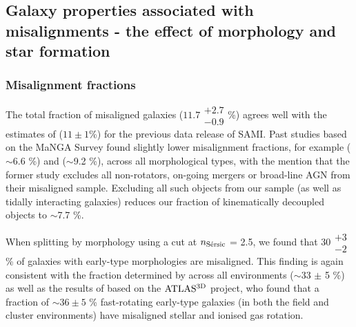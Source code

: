 \documentclass[fleqn,usenatbib]{mnras}
\begin{document}
\subsection{Galaxy properties associated with misalignments - the effect of morphology and star formation}
\label{sec:dpa_distr_discuss}

\subsubsection{Misalignment fractions}
The total fraction of misaligned galaxies ($11.7\substack{+2.7 \\ -0.9}$\%) agrees well with the estimates of \cite{Bryant2019} ($11\pm 1$\%) for the previous data release of SAMI. Past studies based on the MaNGA Survey found slightly lower misalignment fractions, for example \cite{Xu} ($\sim$6.6 \%) and \cite{Duckworth} ($\sim$9.2 \%), across all morphological types, with the mention that the former study excludes all non-rotators, on-going mergers or broad-line AGN from their misaligned sample. Excluding all such objects from our sample (as well as tidally interacting galaxies) reduces our fraction of kinematically decoupled objects to $\sim$7.7 \%.

When splitting by morphology using a cut at $n_{\rm{S\Acute{e}rsic}}$ = 2.5, we found that $30 \substack{+3 \\ -2}\ $\% of galaxies with early-type morphologies are misaligned. This finding is again consistent with the fraction determined by \cite{Bryant2019} across all environments ($\sim$33 $\pm$ 5 \%) as well as the results of \cite{Davis2011} based on the $\rm{ATLAS^{3D}}$ project, who found that a fraction of $\sim 36\pm 5$ \% fast-rotating early-type galaxies (in both the field and cluster environments) have misaligned stellar and ionised gas rotation.
\end{document}
